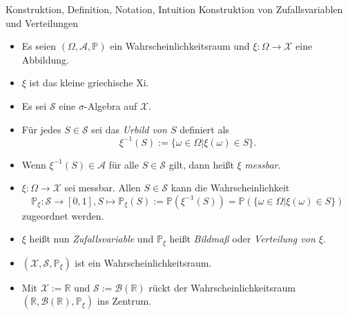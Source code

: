 \documentclass[
  8pt,
  ignorenonframetext,
]{beamer}
\begin{document}
\begin{frame}{Konstruktion, Definition, Notation, Intuition}
\protect\hypertarget{konstruktion-definition-notation-intuition}{}
Konstruktion von Zufallsvariablen und Verteilungen \small
{}

\begin{itemize}
\item Es seien $(\Omega,\mathcal{A},\mathbb{P})$ ein Wahrscheinlichkeitsraum und $\xi : \Omega \to \mathcal{X}$ eine Abbildung.
\item $\xi$ ist das kleine griechische Xi.
\item Es sei $\mathcal{S}$ eine $\sigma$-Algebra auf $\mathcal{X}$.
\item Für jedes $S \in \mathcal{S}$ sei das \textit{Urbild von $S$} definiert als
\begin{equation}
\xi^{-1}(S) := \{\omega \in \Omega|\xi(\omega) \in S\}.
\end{equation}
\item Wenn $\xi^{-1}(S) \in \mathcal{A}$ für alle $S \in \mathcal{S}$ gilt,
dann heißt $\xi$ \textit{messbar}.
\item $\xi : \Omega \to \mathcal{X}$ sei messbar. Allen $S \in \mathcal{S}$
kann die Wahrscheinlichkeit
\begin{equation}
\mathbb{P}_\xi : \mathcal{S} \to [0,1], S \mapsto
\mathbb{P}_\xi(S)
:= \mathbb{P}\left(\xi^{-1}(S)\right)
 = \mathbb{P}\left(\{\omega \in \Omega|\xi(\omega) \in S\}\right)
\end{equation}
zugeordnet werden.
\item $\xi$ heißt nun \textit{Zufallsvariable} und $\mathbb{P}_\xi$ heißt
\textit{Bildmaß} oder \textit{Verteilung von $\xi$}.
\item $(\mathcal{X},\mathcal{S},\mathbb{P}_\xi)$ ist ein Wahrscheinlichkeitsraum.
\item Mit $\mathcal{X} := \mathbb{R}$ und $\mathcal{S} := \mathcal{B}(\mathbb{R})$ rückt der
Wahrscheinlichkeitsraum $(\mathbb{R},\mathcal{B}(\mathbb{R}),\mathbb{P}_\xi)$ ins Zentrum.
\end{itemize}
\end{frame}
\end{document}

